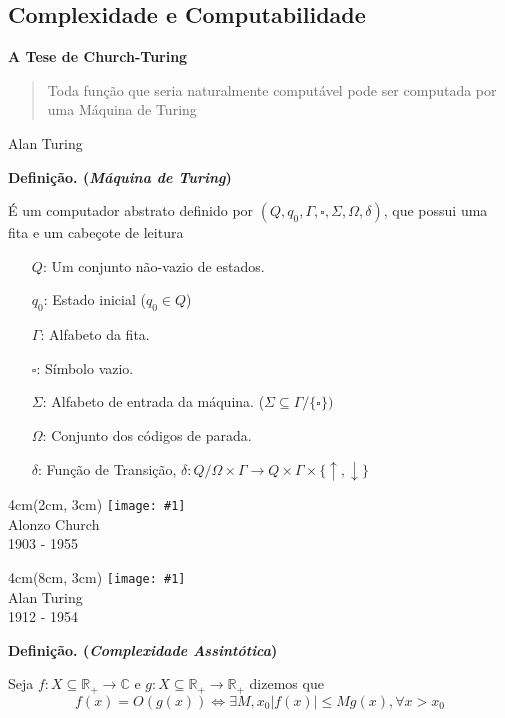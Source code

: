 \documentclass[t]{beamer}
\newcommand{\titulo}[1]{%
	\textbf{\Large #1\\}
}
\newcommand{\definicao}[1]{%
	\textbf{Definição. (\emph{#1})\\}
}
\newcommand{\frasepor}[2]{
	\begin{center}
		\begin{quote}
			#1
		\end{quote}
		\hfill {\small #2}
	\end{center}
}
\newcommand{\person}[6]{%
\begin{textblock*}{#4}(#5, #6)
	\texttt{[image: \#1]}\\
	#2\\
	{\small #3}
\end{textblock*}
}
\begin{document}
	\subsection{Complexidade e Computabilidade}	
	
	\begin{frame}[label=turing]{\subsecname}
	\titulo{A Tese de Church-Turing}
	
	
	\frasepor{Toda função que seria naturalmente computável pode ser computada por uma Máquina de Turing}{Alan Turing}
	\end{frame}
	
	\begin{frame}{\subsecname}
	\definicao{Máquina de Turing}
	É um computador abstrato definido por $(Q, q_0, \Gamma, \square, \Sigma, \Omega, \delta)$, que possui uma fita e um cabeçote de leitura
	
	\begin{itemize}
		\item[$Q$:] Um conjunto não-vazio de estados.
		\item[$q_0$:] Estado inicial ($q_0 \in Q$)
		\item[$\Gamma$:] Alfabeto da fita.
		\item[$\square$:] Símbolo vazio.
		\item[$\Sigma$:] Alfabeto de entrada da máquina. ($\Sigma \subseteq \Gamma \slash \{\square\})$ 
		\item[$\Omega$:] Conjunto dos códigos de parada.
		\item[$\delta$:] Função de Transição, $\delta : Q \slash \Omega \times \Gamma \to Q \times \Gamma \times \{\uparrow, \downarrow\}$
	\end{itemize}
	\end{frame}
	
	\begin{frame}{\subsecname}
		\person{church.jpg}{Alonzo Church}{1903 - 1955}{4cm}{2cm}{3cm}
		\person{turing.jpg}{Alan Turing}{1912 - 1954}{4cm}{8cm}{3cm}
	\end{frame}
	
	
	\begin{frame}{\subsecname}
		\definicao{Complexidade Assintótica}
		Seja $f : X \subseteq \mathbb{R}_+ \to \mathbb{C}$ e $g : X \subseteq \mathbb{R}_+ \to \mathbb{R}_+$ dizemos que
		$$f(x) = O(g(x)) \iff \exists M, x_0 |f(x)| \le M g(x), \forall x > x_0$$
	\end{frame}
	
\end{document}
